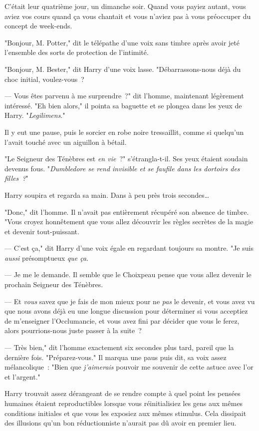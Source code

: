 C'était leur quatrième jour, un dimanche soir. Quand vous payiez autant, vous aviez vos cours quand ça vous chantait et vous n'aviez pas à vous préoccuper du concept de week-ends.

"Bonjour, M. Potter," dit le télépathe d'une voix sans timbre après avoir jeté l'ensemble des sorts de protection de l'intimité.

"Bonjour, M. Bester," dit Harry d'une voix lasse. "Débarrassons-nous déjà du choc initial, voulez-vous~?

--- Vous êtes parvenu à me surprendre~?" dit l'homme, maintenant légèrement intéressé. "Eh bien alors," il pointa sa baguette et se plongea dans les yeux de Harry. "\emph{Legilimens}."

Il y eut une pause, puis le sorcier en robe noire tressaillit, comme si quelqu'un l'avait touché avec un aiguillon à bétail.

"Le Seigneur des Ténèbres est \emph{en vie}~?" s'étrangla-t-il. Ses yeux étaient soudain devenus fous. "\emph{Dumbledore se rend invisible et se faufile dans les dortoirs des filles~?}"

Harry soupira et regarda sa main. Dans à peu près trois secondes…

"Donc," dit l'homme. Il n'avait pas entièrement récupéré son absence de timbre. "Vous croyez honnêtement que vous allez découvrir les règles secrètes de la magie et devenir tout-puissant.

--- C'est ça," dit Harry d'une voix égale en regardant toujours sa montre. "Je suis \emph{aussi} présomptueux \emph{que ça}.

--- Je me le demande. Il semble que le Choixpeau pense que vous allez devenir le prochain Seigneur des Ténèbres.

--- Et \emph{vous} savez que je fais de mon mieux pour ne \emph{pas} le devenir, et vous avez vu que nous avons déjà eu une longue discussion pour déterminer si vous acceptiez de m'enseigner l'Occlumancie, et vous avez fini par décider que vous le ferez, alors pourrions-nous juste passer à la suite~?

--- Très bien," dit l'homme exactement six secondes plus tard, pareil que la dernière fois. "Préparez-vous." Il marqua une paus puis dit, sa voix assez mélancolique~: "Bien que \emph{j'aimerais} pouvoir me souvenir de cette astuce avec l'or et l'argent."

Harry trouvait assez dérangeant de se rendre compte à quel point les pensées humaines étaient reproductibles lorsque vous réinitialisiez les gens aux mêmes conditions initiales et que vous les exposiez aux mêmes stimulus. Cela dissipait des illusions qu'un bon réductionniste n'aurait pas dû avoir en premier lieu.


